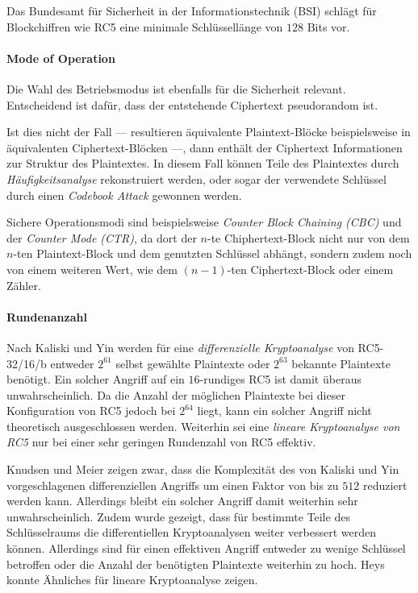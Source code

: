 \documentclass[course=erap]{aspdoc}
\begin{document}
Das Bundesamt für Sicherheit in der Informationstechnik (BSI) schlägt für Blockchiffren wie RC5 eine minimale Schlüssellänge von $128$ Bits vor.\cite[p.21]{bsi}

\paragraph{Mode of Operation} Die Wahl des Betriebsmodus ist ebenfalls für die Sicherheit relevant. Entscheidend ist dafür, dass der entstehende Ciphertext pseudorandom ist.\bigbreak

Ist dies nicht der Fall --- resultieren äquivalente Plaintext-Blöcke beispielsweise in äquivalenten Ciphertext-Blöcken ---, dann enthält der Ciphertext Informationen zur Struktur des Plaintextes\cite[p.22]{bsi}. In diesem Fall können Teile des Plaintextes durch \textit{Häufigkeitsanalyse} rekonstruiert werden\cite[p.22]{bsi}, oder sogar der verwendete Schlüssel durch einen \textit{Codebook Attack} gewonnen werden\cite[p.2]{elbaz}.\bigbreak

Sichere Operationsmodi sind beispielsweise \textit{Counter Block Chaining (CBC)} und der \textit{Counter Mode (CTR)}, da dort der $n$-te Chiphertext-Block nicht nur von dem $n$-ten Plaintext-Block und dem genutzten Schlüssel abhängt, sondern zudem noch von einem weiteren Wert, wie dem $(n-1)$-ten Ciphertext-Block oder einem Zähler.\cite[p.22]{bsi}

\paragraph{Rundenanzahl} Nach Kaliski und Yin werden für eine \textit{differenzielle Kryptoanalyse} von RC5-32/16/b entweder $2^{61}$ selbst gewählte Plaintexte oder $2^{63}$ bekannte Plaintexte benötigt. Ein solcher Angriff auf ein $16$-rundiges RC5 ist damit überaus unwahrscheinlich. Da die Anzahl der möglichen Plaintexte bei dieser Konfiguration von RC5 jedoch bei $2^{64}$ liegt, kann ein solcher Angriff nicht theoretisch ausgeschlossen werden.\cite[p.6]{kaliski+yin} Weiterhin sei eine \textit{lineare Kryptoanalyse von RC5} nur bei einer sehr geringen Rundenzahl von RC5 effektiv.\cite[p.28]{kaliski+yin}\bigbreak

Knudsen und Meier zeigen zwar, dass die Komplexität des von Kaliski und Yin vorgeschlagenen differenziellen Angriffs um einen Faktor von bis zu $512$ reduziert werden kann.\cite[p.2]{knudsen+meier} Allerdings bleibt ein solcher Angriff damit weiterhin sehr unwahrscheinlich. Zudem wurde gezeigt, dass für bestimmte Teile des Schlüsselraums die differentiellen Kryptoanalysen weiter verbessert werden können.\cite[p.13]{knudsen+meier} Allerdings sind für einen effektiven Angriff entweder zu wenige Schlüssel betroffen oder die Anzahl der benötigten Plaintexte weiterhin zu hoch. Heys konnte Ähnliches für lineare Kryptoanalyse zeigen.\cite[p.5]{heys}\bigbreak
\end{document}
